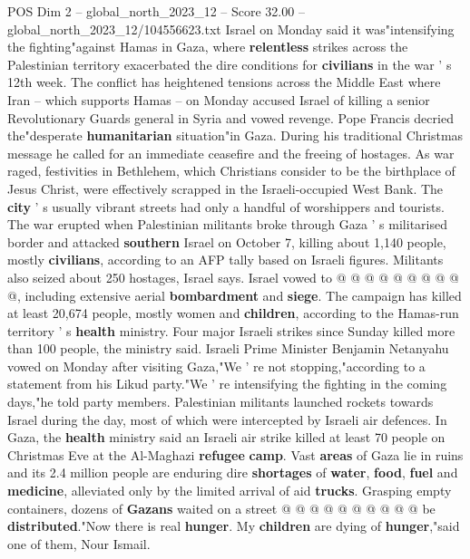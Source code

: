 \begin{textsample}{POS Dim 2 – global\_north\_2023\_12 – Score 32.00 – global\_north\_2023\_12/104556623.txt}  \label{ex:f2_pos_119}
Israel on Monday said it was"intensifying the fighting"against Hamas in Gaza, where \textbf{relentless} strikes across the Palestinian territory exacerbated the dire conditions for \textbf{civilians} in the war ' s 12th week.
The conflict has heightened tensions across the Middle East where Iran -- which supports Hamas -- on Monday accused Israel of killing a senior Revolutionary Guards general in Syria and vowed revenge.
Pope Francis decried the"desperate \textbf{humanitarian} situation"in Gaza.
During his traditional Christmas message he called for an immediate ceasefire and the freeing of hostages.
As war raged, festivities in Bethlehem, which Christians consider to be the birthplace of Jesus Christ, were effectively scrapped in the Israeli-occupied West Bank.
The \textbf{city} ' s usually vibrant streets had only a handful of worshippers and tourists.
The war erupted when Palestinian militants broke through Gaza ' s militarised border and attacked \textbf{southern} Israel on October 7, killing about 1,140 people, mostly \textbf{civilians}, according to an AFP tally based on Israeli figures.
Militants also seized about 250 hostages, Israel says.
Israel vowed to @ @ @ @ @ @ @ @ @ @, including extensive aerial \textbf{bombardment} and \textbf{siege}.
The campaign has killed at least 20,674 people, mostly women and \textbf{children}, according to the Hamas-run territory ' s \textbf{health} ministry.
Four major Israeli strikes since Sunday killed more than 100 people, the ministry said.
Israeli Prime Minister Benjamin Netanyahu vowed on Monday after visiting Gaza,"We ' re not stopping,"according to a statement from his Likud party."We ' re intensifying the fighting in the coming days,"he told party members.
Palestinian militants launched rockets towards Israel during the day, most of which were intercepted by Israeli air defences.
In Gaza, the \textbf{health} ministry said an Israeli air strike killed at least 70 people on Christmas Eve at the Al-Maghazi \textbf{refugee} \textbf{camp}.
Vast \textbf{areas} of Gaza lie in ruins and its 2.4 million people are enduring dire \textbf{shortages} of \textbf{water}, \textbf{food}, \textbf{fuel} and \textbf{medicine}, alleviated only by the limited arrival of aid \textbf{trucks}.
Grasping empty containers, dozens of \textbf{Gazans} waited on a street @ @ @ @ @ @ @ @ @ @ be \textbf{distributed}."Now there is real \textbf{hunger}.
My \textbf{children} are dying of \textbf{hunger},"said one of them, Nour Ismail.

\end{textsample}
